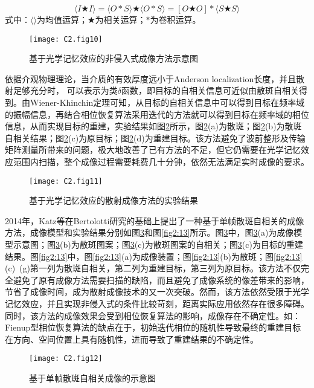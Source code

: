 \begin{equation}
  \langle I\bigstar I \rangle = \langle O*S \rangle \bigstar \langle O*S \rangle = [O \bigstar O] * \langle S\bigstar S \rangle
\label{eq:2.5}
\end{equation}
式中：$\langle \rangle$为均值运算；$\bigstar$为相关运算；$*$为卷积运算。

\begin{figure}[htp]
	\centering
	\texttt{[image: C2.fig10]}
	\caption{基于光学记忆效应的非侵入式成像方法示意图}
	\label{fig2:10}
\end{figure}

依据介观物理理论，当介质的有效厚度远小于Anderson localization长度，并且散射足够充分时， 可以表示为类$\delta$函数，即目标的自相关信息可近似由散斑自相关得到。由Wiener-Khinchin定理可知，从目标的自相关信息中可以得到目标在频率域的振幅信息，再结合相位恢复算法采用迭代的方法就可以得到目标在频率域的相位信息，从而实现目标的重建，实验结果如图\ref{fig2:11}所示，图\ref{fig2:11}(a)为散斑；图\ref{fig2:11}(b)为散斑自相关结果；图\ref{fig2:11}(c)为原目标；图\ref{fig2:11}(d)为重建目标。该方法避免了波前整形及传输矩阵测量所带来的问题，极大地改善了已有方法的不足，但它仍需要在光学记忆效应范围内扫描，整个成像过程需要耗费几十分钟，依然无法满足实时成像的要求。

\begin{figure}[htp]
	\centering
	\texttt{[image: C2.fig11]}
	\caption{基于光学记忆效应的散射成像方法的实验结果}
	\label{fig2:11}
\end{figure}

2014年，Katz等在Bertolotti研究的基础上提出了一种基于单帧散斑自相关的成像方法，成像模型和实验结果分别如图\ref{fig2:12}和图\ref{fig2:13}所示。图\ref{fig2:12}中，图\ref{fig2:12}(a)为成像模型示意图；图\ref{fig2:12}(b)为散斑图案；图\ref{fig2:12}(c)为散斑图案的自相关；图\ref{fig2:12}(c)为目标的重建结果。图\ref{fig2:13}中，图\ref{fig2:13}(a)为成像装置；图\ref{fig2:13}(b)为散斑；图\ref{fig2:13}(c)~(g)第一列为散斑自相关，第二列为重建目标，第三列为原目标。该方法不仅完全避免了原有成像方法需要扫描的缺陷，而且避免了成像系统的像差带来的影响，节省了成像时间，成为散射成像技术的又一次突破。然而，该方法依然受限于光学记忆效应，并且实现非侵入式的条件比较苛刻，距离实际应用依然存在很多障碍。同时，该方法的成像效果会受到相位恢复算法的影响，成像存在不确定性。如：Fienup型相位恢复算法的缺点在于，初始迭代相位的随机性导致最终的重建目标在方向、空间位置上具有随机性，进而导致了重建结果的不确定性。

\begin{figure}[htp]
	\centering
	\texttt{[image: C2.fig12]}
	\caption{基于单帧散斑自相关成像的示意图}
	\label{fig2:12}
\end{figure}

